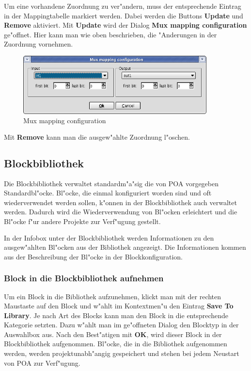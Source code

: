 \documentclass[a4paper,titlepage,12pt,ngerman]{scrbook}
\begin{document}
Um eine vorhandene Zuordnung zu ver"andern, muss der entsprechende Eintrag in der Mappingtabelle markiert werden. Dabei werden die Buttons {\bf Update} und {\bf Remove} aktiviert.\newline
Mit {\bf Update} wird der Dialog {\bf Mux mapping configuration} ge"offnet. Hier kann man wie oben beschrieben, die "Anderungen in der Zuordnung vornehmen.\newline

\begin{figure}[htbp]

\begin{center}

\includegraphics[width=10cm]{Muxzuordnung}

\caption{Mux mapping configuration}\label{test}

\end{center}

\end{figure}

Mit {\bf Remove} kann man die ausgew"ahlte Zuordnung l"oschen.\par


\subsection{Blockbibliothek}
Die Blockbibliothek verwaltet standardm"a"sig die von POA vorgegeben Standardbl"ocke.
Bl"ocke, die einmal konfiguriert worden sind und oft wiederverwendet werden sollen, 
k"onnen in der Blockbibliothek auch verwaltet werden. Dadurch wird die Wiederverwendung
von Bl"ocken erleichtert und die Bl"ocke f"ur andere Projekte zur Verf"ugung gestellt.\par
In der Infobox unter der Blockbibliothek werden Informationen zu den ausgew"ahlten Bl"ocken aus der Bibliothek angezeigt. Die Informationen kommen aus der Beschreibung der Bl"ocke in der Blockkonfiguration.
\subsubsection{Block in die Blockbibliothek aufnehmen}
Um ein Block in die Bibliothek aufzunehmen, klickt man mit der rechten Maustaste
auf den Block und w"ahlt im Kontextmen"u den Eintrag {\bf Save To Library}. Je nach Art des Blocks kann man den Block in die entsprechende Kategorie setzten. Dazu w"ahlt man im ge"offneten Dialog den Blocktyp in der Auswahlbox aus. Nach den Best"atigen mit {\bf OK}, wird dieser Block in der Blockbibliothek aufgenommen.\newline
Bl"ocke, die in die Bibliothek aufgenommen werden, werden projektunabh"angig gespeichert
und stehen bei jedem Neustart von POA zur Verf"ugung.
\end{document}
